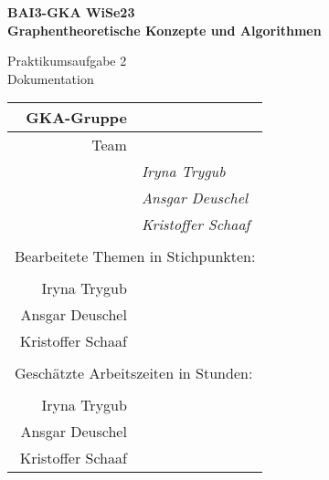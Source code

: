 

\thispagestyle{empty}
\begin{center}

    {\large {\bf   BAI3-GKA WiSe23 \\ Graphentheoretische Konzepte und Algorithmen \\[5mm]} }
    
{\huge Praktikumsaufgabe 2  \\[5mm] Dokumentation}\\

\end{center}

				\begin{tabular}[t]{|r|l|}
				 \hline
				GKA-Gruppe&                 \raisebox{-3mm}{\rule[8mm]{100mm}{0mm} }\\ \hline    
				Team &                                                        \\ \hline			
				& \textit{Iryna Trygub }               \\ \hline    
				& \textit{Ansgar Deuschel }               \\ \hline			
				& \textit{Kristoffer Schaaf }             \\ \hline  			
				\multicolumn{2}{c}{}\\  			
				\multicolumn{2}{l}{Bearbeitete Themen in Stichpunkten:}\\			
				\multicolumn{2}{c}{}\\  \hline
				Iryna Trygub &              \\ \hline    
				Ansgar Deuschel &                \\ \hline			
				Kristoffer Schaaf &             \\ \hline 		
				\multicolumn{2}{c}{}\\  			
				\multicolumn{2}{l}{Geschätzte Arbeitszeiten in Stunden:}\\			
				\multicolumn{2}{c}{}\\  \hline
				Iryna Trygub &               \\ \hline    
				Ansgar Deuschel &                \\ \hline			
				Kristoffer Schaaf &               \\ \hline 			
				\end{tabular}
~\\[4mm]
		
		
\vfill

